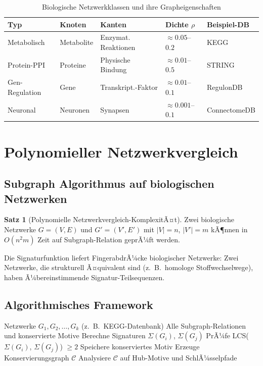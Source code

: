 ﻿\documentclass[a4paper,12pt]{scrreprt}
\theoremstyle{definition}
\newtheorem{satz}{Satz}[section]
\begin{document}
\begin{table}[H]
\caption{Biologische Netzwerkklassen und ihre Grapheigenschaften}
\label{tab:nf4_netze}
\begin{tabular}{lllll}
\toprule
\textbf{Typ} & \textbf{Knoten} & \textbf{Kanten} & \textbf{Dichte $\rho$} & \textbf{Beispiel-DB} \\
\midrule
Metabolisch    & Metabolite & Enzymat. Reaktionen & $\approx 0.05$--$0.2$ & KEGG \\
Protein-PPI    & Proteine   & Physische Bindung   & $\approx 0.01$--$0.5$ & STRING \\
Gen-Regulation & Gene       & Transkript.-Faktor  & $\approx 0.01$--$0.1$ & RegulonDB \\
Neuronal       & Neuronen   & Synapsen            & $\approx 0.001$--$0.1$ & ConnectomeDB \\
\bottomrule
\end{tabular}
\end{table}

\section{Polynomieller Netzwerkvergleich}

\subsection{Subgraph Algorithmus auf biologischen Netzwerken}

\begin{satz}[Polynomielle Netzwerkvergleich-KomplexitÃ¤t]
  Zwei biologische Netzwerke $G=(V,E)$ und $G'=(V',E')$ mit
  $|V|=n$, $|V'|=m$ kÃ¶nnen in $O(n^2 m)$ Zeit auf Subgraph-Relation
  geprÃ¼ft werden.
\end{satz}

Die Signaturfunktion liefert FingerabdrÃ¼cke biologischer Netzwerke:
Zwei Netzwerke, die strukturell Ã¤quivalent sind (z.\ B.\ homologe
Stoffwechselwege), haben Ã¼bereinstimmende Signatur-Teilsequenzen.

\subsection{Algorithmisches Framework}

\begin{algorithm}[H]
\caption{Polynomielle biologische Netzwerkanalyse}
\label{alg:nf4}
\begin{algorithmic}[1]
\Require Netzwerke $G_1, G_2, \ldots, G_k$ (z.\ B.\ KEGG-Datenbank)
\Ensure Alle Subgraph-Relationen und konservierte Motive
  \State Berechne Signaturen $\Sigma(G_i)$, $\Sigma(G_j)$
  \State PrÃ¼fe LCS($\Sigma(G_i)$, $\Sigma(G_j)$) $\geq 2$
    \State Speichere konserviertes Motiv
  \EndIf
\EndFor
\State Erzeuge Konservierungsgraph $\mathcal{C}$
\State Analysiere $\mathcal{C}$ auf Hub-Motive und SchlÃ¼sselpfade
\end{algorithmic}
\end{algorithm}
\end{document}
